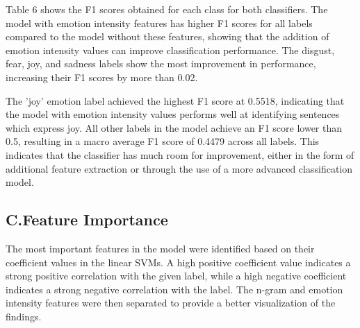 \documentclass{icsthesis}
\begin{document}
\begin{mainmatter}
                Table 6 shows the F1 scores obtained for each class for both classifiers. The model with emotion intensity features has higher F1 scores for all labels compared to the model without these features, showing that the addition of emotion intensity values can improve classification performance. The disgust, fear, joy, and sadness labels show the most improvement in performance, increasing their F1 scores by more than 0.02.
                
                The 'joy' emotion label achieved the highest F1 score at 0.5518, indicating that the model with emotion intensity values performs well at identifying sentences which express joy. All other labels in the model achieve an F1 score lower than 0.5, resulting in a macro average F1 score of 0.4479 across all labels. This indicates that the classifier has much room for improvement, either in the form of additional feature extraction or through the use of a more advanced classification model.
                
            \subsection{C.\hspace{0.5cm}Feature Importance}
                The most important features in the model were identified based on their coefficient values in the linear SVMs. A high positive coefficient value indicates a strong positive correlation with the given label, while a high negative coefficient indicates a strong negative correlation with the label. The n-gram and emotion intensity features were then separated to provide a better visualization of the findings.
                

\end{mainmatter}
\end{document}
